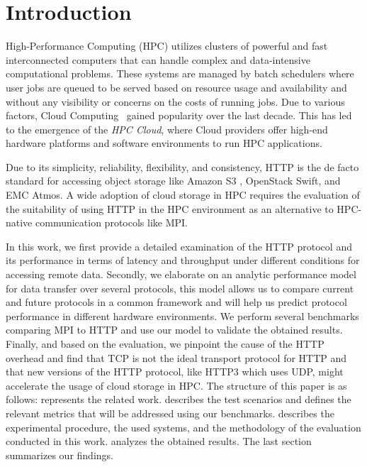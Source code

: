 \documentclass[runningheads]{llncs}
\begin{document}
\section {Introduction}
High-Performance Computing (HPC) utilizes clusters of powerful and fast interconnected computers that can handle complex and data-intensive computational problems. These systems are managed by batch schedulers \cite{ma2004dynamic} where user jobs are queued to be served based on resource usage and availability and without any visibility or concerns on the costs of running jobs.
Due to various factors, Cloud Computing \,\cite {mell2011nist} gained popularity over the last decade. This has led to the emergence of the \textit{HPC Cloud}, where Cloud providers offer high-end hardware platforms and software environments to run HPC applications.

Due to its simplicity, reliability, flexibility, and consistency, HTTP is the de facto standard for accessing object storage like Amazon S3 \cite{awsS3Url}, OpenStack Swift, and EMC Atmos. A wide adoption of cloud storage in HPC requires the evaluation of the suitability of using HTTP in the HPC environment as an alternative to HPC-native communication protocols like MPI.

In this work, we first provide a detailed examination of the HTTP protocol and its performance in terms of latency and throughput under different conditions for accessing remote data. Secondly, we elaborate on an analytic performance model for data transfer over several protocols, this model allows us to compare current and future protocols in a common framework and will help us predict protocol performance in different hardware environments. We perform several benchmarks comparing MPI to HTTP and use our model to validate the obtained results. Finally, and based on the evaluation, we pinpoint the cause of the HTTP overhead and find that TCP is not the ideal transport protocol for HTTP and that new versions of the HTTP protocol, like HTTP3 which uses UDP, might accelerate the usage of cloud storage in HPC.
The structure of this paper is as follows:  represents the related work.  describes the test scenarios and defines the relevant metrics that will be addressed using our benchmarks.  describes the experimental procedure, the used systems, and the methodology of the evaluation conducted in this work.  analyzes the obtained results. The last section summarizes our findings.
\end{document}
